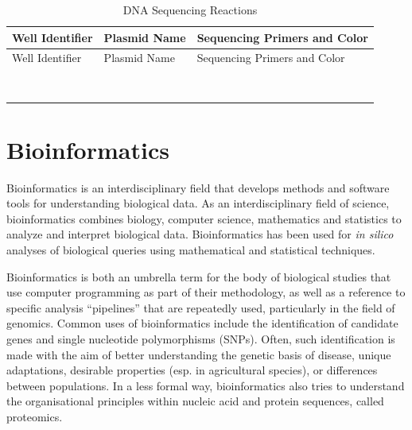 \documentclass[]{book}
\theoremstyle{definition}
\theoremstyle{definition}
\theoremstyle{definition}
\theoremstyle{remark}
\begin{document}
\begin{longtable}[]{@{}lll@{}}
\caption{\label{tab:seq} DNA Sequencing Reactions}\tabularnewline
\toprule
Well Identifier & Plasmid Name & Sequencing Primers and
Color\tabularnewline
\midrule
\endfirsthead
\toprule
Well Identifier & Plasmid Name & Sequencing Primers and
Color\tabularnewline
\midrule
\endhead
& &\tabularnewline
& &\tabularnewline
& &\tabularnewline
& &\tabularnewline
& &\tabularnewline
& &\tabularnewline
& &\tabularnewline
& &\tabularnewline
\bottomrule
\end{longtable}

\chapter{Bioinformatics}\label{bioinformatics}

Bioinformatics is an interdisciplinary field that develops methods and
software tools for understanding biological data. As an
interdisciplinary field of science, bioinformatics combines biology,
computer science, mathematics and statistics to analyze and interpret
biological data. Bioinformatics has been used for \emph{in silico}
analyses of biological queries using mathematical and statistical
techniques.

Bioinformatics is both an umbrella term for the body of biological
studies that use computer programming as part of their methodology, as
well as a reference to specific analysis ``pipelines'' that are
repeatedly used, particularly in the field of genomics. Common uses of
bioinformatics include the identification of candidate genes and single
nucleotide polymorphisms (SNPs). Often, such identification is made with
the aim of better understanding the genetic basis of disease, unique
adaptations, desirable properties (esp. in agricultural species), or
differences between populations. In a less formal way, bioinformatics
also tries to understand the organisational principles within nucleic
acid and protein sequences, called proteomics.
\end{document}
